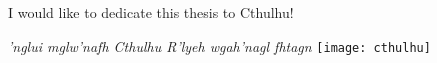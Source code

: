 \graphicspath{{content/dedication/figures/}}
\begin{dedication}

I would like to dedicate this thesis to Cthulhu!

\emph{'nglui mglw'nafh Cthulhu R'lyeh wgah'nagl fhtagn}
\texttt{[image: cthulhu]}

\end{dedication}